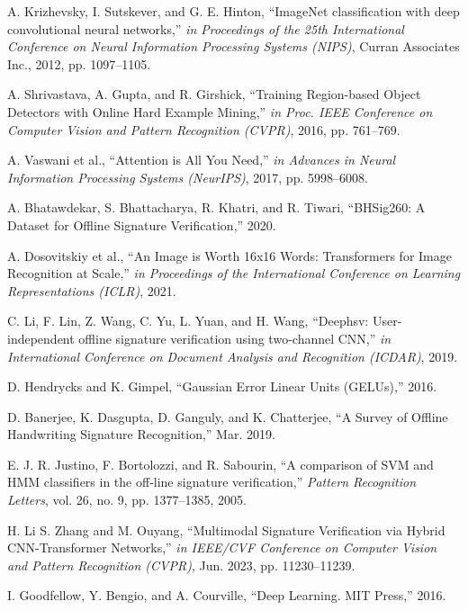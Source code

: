 




\begin{thebibliography}{10}

A. Krizhevsky, I. Sutskever, and G. E. Hinton, ``ImageNet classification with deep convolutional neural networks,'' {\em in Proceedings of the 25th International Conference on Neural Information Processing Systems (NIPS)}, Curran Associates Inc.,
2012, pp. 1097--1105.

A. Shrivastava, A. Gupta, and R. Girshick, ``Training Region-based Object Detectors with Online Hard Example Mining,'' {\em in Proc. IEEE Conference on Computer Vision and Pattern Recognition (CVPR)},
2016, pp. 761--769.

A. Vaswani et al., ``Attention is All You Need,'' {\em in Advances in Neural Information Processing Systems (NeurIPS)},
2017, pp. 5998--6008.

A. Bhatawdekar, S. Bhattacharya, R. Khatri, and R. Tiwari, ``BHSig260: A Dataset for Offline Signature Verification,''
2020.

A. Dosovitskiy et al., ``An Image is Worth 16x16 Words: Transformers for Image Recognition at Scale,'' {\em in Proceedings of the International Conference on Learning Representations (ICLR)},
2021.

C. Li, F. Lin, Z. Wang, C. Yu, L. Yuan, and H. Wang, ``Deephsv: User-independent offline signature verification using two-channel CNN,'' {\em in International Conference on Document Analysis and Recognition (ICDAR)},
2019.

D. Hendrycks and K. Gimpel, ``Gaussian Error Linear Units (GELUs),''
2016.

D. Banerjee, K. Dasgupta, D. Ganguly, and K. Chatterjee, ``A Survey of Offline Handwriting Signature Recognition,''
Mar. 2019.

E. J. R. Justino, F. Bortolozzi, and R. Sabourin, ``A comparison of SVM and HMM classifiers in the off-line signature verification,'' {\em Pattern Recognition Letters}, vol. 26, no. 9, pp. 1377--1385,
2005.

H. Li S. Zhang and M. Ouyang, ``Multimodal Signature Verification via Hybrid CNN-Transformer Networks,'' {\em in IEEE/CVF Conference on Computer Vision and Pattern Recognition (CVPR)},
Jun. 2023, pp. 11230--11239.

I. Goodfellow, Y. Bengio, and A. Courville, ``Deep Learning. MIT Press,''
2016.


\end{thebibliography}
